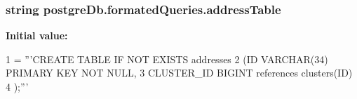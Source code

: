 \subsubsection[{address\+Table}]{\setlength{\rightskip}{0pt plus 5cm}string postgre\+Db.\+formated\+Queries.\+address\+Table}\label{namespacepostgreDb_1_1formatedQueries_a404bfcbf555fbc51bdb53a3cb9fb5b26}
{\bfseries Initial value\+:}
\begin{DoxyCode}
1 = \textcolor{stringliteral}{'''CREATE TABLE IF NOT EXISTS addresses}
2 \textcolor{stringliteral}{                (ID                 VARCHAR(34) PRIMARY KEY NOT NULL,}
3 \textcolor{stringliteral}{                CLUSTER\_ID          BIGINT              references clusters(ID)}
4 \textcolor{stringliteral}{                );'''}
\end{DoxyCode}
\hypertarget{namespacepostgreDb_1_1formatedQueries_abb029ebd46317f69b75128343a4449c6}{}
